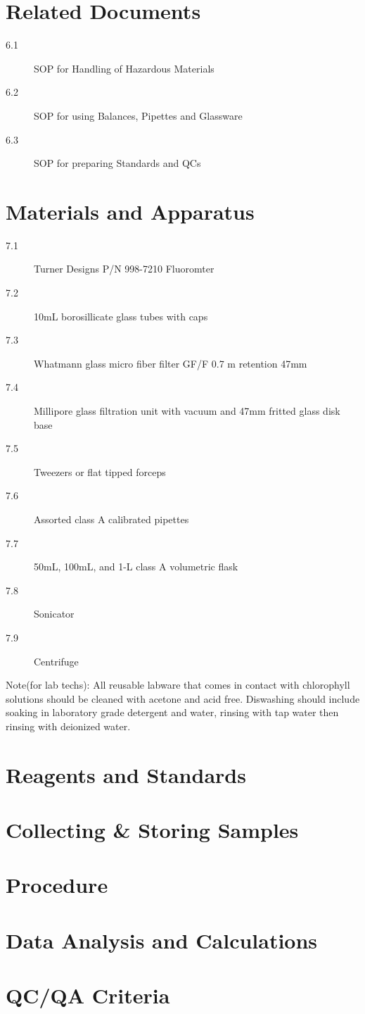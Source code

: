 \documentclass{article}
\begin{document}
\section{Related Documents}
\begin{description}
\item[6.1] SOP for Handling of Hazardous Materials
\item[6.2] SOP for using Balances, Pipettes and Glassware
\item[6.3] SOP for preparing Standards and QCs %
\end{description}

\section{Materials and Apparatus}
\begin{description}
\item[7.1] Turner Designs P/N 998-7210 Fluoromter
\item[7.2] 10mL borosillicate glass tubes with caps
\item[7.3] Whatmann glass micro fiber filter GF/F 0.7 \micro m retention 47mm
\item[7.4] Millipore glass filtration unit with vacuum and 47mm fritted glass disk base
\item[7.5] Tweezers or flat tipped forceps
\item[7.6] Assorted class A calibrated pipettes
\item[7.7] 50mL, 100mL, and 1-L class A volumetric flask
\item[7.8] Sonicator %
\item[7.9] Centrifuge %
\end{description}

Note(for lab techs): All reusable labware that comes in contact with chlorophyll solutions should be cleaned with acetone and acid free. Diswashing should include soaking in laboratory grade detergent and water, rinsing with tap water then rinsing with deionized water. 

\section{Reagents and Standards}
\section{Collecting \& Storing Samples}
\section{Procedure}
\section{Data Analysis and Calculations}
\section{QC/QA Criteria}
\end{document}

